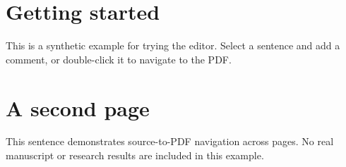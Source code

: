 \section{Getting started}
This is a synthetic example for trying the editor.
Select a sentence and add a comment, or double-click it to navigate to the PDF.

\newpage
\section{A second page}
This sentence demonstrates source-to-PDF navigation across pages.
No real manuscript or research results are included in this example.
